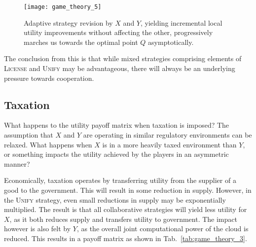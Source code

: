 \begin{figure}[!htbp]
\texttt{[image: game\_theory\_5]}
\captionspacefig \caption{Adaptive strategy revision by $X$ and $Y$, yielding incremental local utility improvements without affecting the other, progressively marches us towards the optimal point $Q$ asymptotically.}\label{fig:game_theory_5}
\end{figure}

The conclusion from this is that while mixed strategies comprising elements of \textsc{License} and \textsc{Unify} may be advantageous, there will always be an underlying pressure towards cooperation.

\subsection{Taxation}

What happens to the utility payoff matrix when taxation is imposed? The assumption that $X$ and $Y$ are operating in similar regulatory environments can be relaxed. What happens when $X$ is in a more heavily taxed environment than $Y$, or something impacts the utility achieved by the players in an asymmetric manner?

Economically, taxation operates by transferring utility from the supplier of a good to the government. This will result in some reduction in supply. However, in the \textsc{Unify} strategy, even small reductions in supply may be exponentially multiplied. The result is that all collaborative strategies will yield less utility for $X$, as it both reduces supply and transfers utility to government. The impact however is also felt by $Y$, as the overall joint computational power of the cloud is reduced. This results in a payoff matrix as shown in Tab.~\ref{tab:game_theory_3}.

\begin{table}[!htbp]
\captionspacetab \caption{Example utility payoff matrix in the presence of taxation on quantum computers. The effect is a net depreciation in achievable utility.}\label{tab:game_theory_3}
\end{table}

